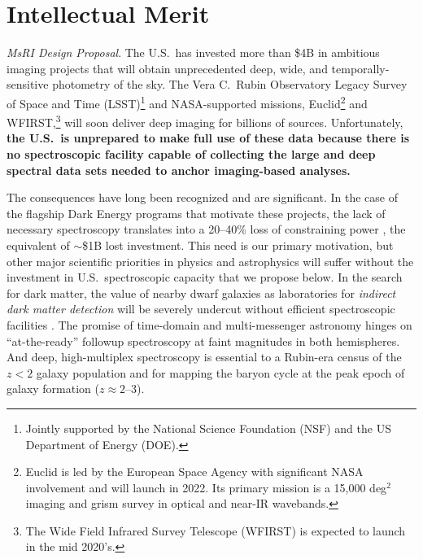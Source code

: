 \documentclass[oneside,11pt]{amsart}
\begin{document}


\setcounter{page}{1}


\section{Intellectual Merit}

\noindent \emph{MsRI Design Proposal}. The U.S.\ has invested more than \$4B in ambitious imaging projects that will obtain unprecedented deep, wide, and temporally-sensitive photometry of the sky.  The Vera C.~Rubin Observatory Legacy Survey of Space and Time (LSST)\footnote{Jointly supported by the National Science Foundation (NSF) and the US Department of Energy (DOE).} and NASA-supported missions, Euclid\footnote{Euclid is led by the European Space Agency with significant NASA involvement and will launch in 2022. Its primary mission is a 15,000 deg$^2$ imaging and grism survey in optical and near-IR wavebands.} and WFIRST,\footnote{The Wide Field Infrared Survey Telescope (WFIRST) is expected to launch in the mid 2020's.} will soon deliver deep imaging for billions of sources.  Unfortunately, \textbf{the U.S.\ is unprepared to make full use of these data because there is no spectroscopic facility capable of collecting the large and deep spectral data sets needed to anchor imaging-based analyses.}

The consequences have long been recognized \citep[e.g.,][]{NAP21722} and are significant.  In the case of the flagship Dark Energy programs that motivate these projects, the lack of necessary spectroscopy translates into a 20--40\% loss of constraining power \citep{newman15}, the equivalent of $\sim$\$1B lost investment.  This need is our primary motivation, but other major scientific priorities in physics and astrophysics will suffer without the investment in U.S.\ spectroscopic capacity that we propose below.  In the search for dark matter, the value of nearby dwarf galaxies as laboratories for \emph{indirect dark matter detection} will be severely undercut without efficient spectroscopic facilities \citep[e.g.,][]{simon19}.  The promise of time-domain and multi-messenger astronomy hinges on ``at-the-ready'' followup spectroscopy at faint magnitudes in both hemispheres.  And deep, high-multiplex spectroscopy is essential 
to a Rubin-era census of the $z < 2$ galaxy population and for mapping the baryon cycle at the peak epoch of galaxy formation ($z \approx 2$--3).  
\end{document}
